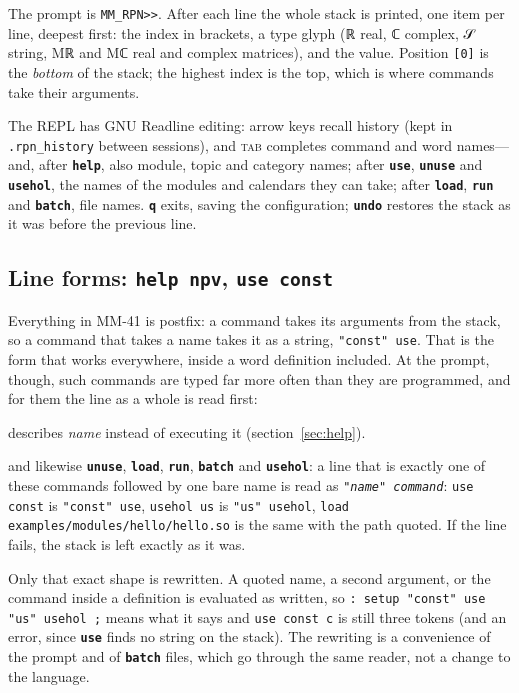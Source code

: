\documentclass[11pt,letterpaper]{article}
\newcommand{\code}[1]{\texttt{#1}}
\newcommand{\g}[1]{{\mathglyphs #1}}   %
\newcommand{\cmd}[1]{\texttt{\textbf{#1}}}
\begin{document}

The prompt is \code{MM\_RPN>>}. After each line the whole stack is printed, one item per line, deepest first: the index in brackets, a type glyph (\g{ℝ} real, \g{ℂ} complex, \g{𝒮} string, M\g{ℝ} and M\g{ℂ} real and complex matrices), and the value. Position \code{[0]} is the \emph{bottom} of the stack; the highest index is the top, which is where commands take their arguments.

The REPL has GNU Readline editing: arrow keys recall history (kept in \code{.rpn\_history} between sessions), and \textsc{tab} completes command and word names---and, after \cmd{help}, also module, topic and category names; after \cmd{use}, \cmd{unuse} and \cmd{usehol}, the names of the modules and calendars they can take; after \cmd{load}, \cmd{run} and \cmd{batch}, file names. \cmd{q} exits, saving the configuration; \cmd{undo} restores the stack as it was before the previous line.

\subsection{Line forms: \code{help npv}, \code{use const}}

Everything in MM-41 is postfix: a command takes its arguments from the stack, so a command that takes a name takes it as a string, \code{"const" use}. That is the form that works everywhere, inside a word definition included. At the prompt, though, such commands are typed far more often than they are programmed, and for them the line as a whole is read first:
\begin{description}[style=nextline,leftmargin=1.5em]
  \item[\code{help \emph{name}}] describes \emph{name} instead of executing it (section~\ref{sec:help}).
  \item[\code{use \emph{name}}] and likewise \cmd{unuse}, \cmd{load}, \cmd{run}, \cmd{batch} and \cmd{usehol}: a line that is exactly one of these commands followed by one bare name is read as \code{"\emph{name}" \emph{command}}: \code{use const} is \code{"const" use}, \code{usehol us} is \code{"us" usehol}, \code{load examples/modules/hello/hello.so} is the same with the path quoted. If the line fails, the stack is left exactly as it was.
\end{description}
Only that exact shape is rewritten. A quoted name, a second argument, or the command inside a definition is evaluated as written, so \code{: setup "const" use "us" usehol ;} means what it says and \code{use const c} is still three tokens (and an error, since \cmd{use} finds no string on the stack). The rewriting is a convenience of the prompt and of \cmd{batch} files, which go through the same reader, not a change to the language.
\end{document}

